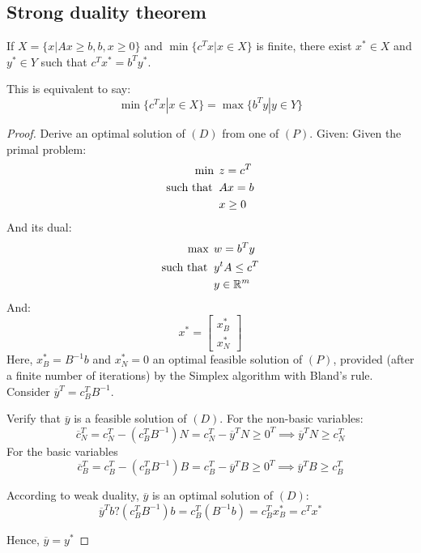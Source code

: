 \subsection{Strong duality theorem}
\begin{theorem}
    If $X=\{x|Ax \geq b, b,x \geq 0\}$ and $\min\{c^Tx|x \in X\}$ is finite, there exist $x^{*} \in X$ and $y^{*} \in Y$ such that $c^Tx^{*}=b^Ty^{*}$. 
\end{theorem}
This is equivalent to say: 
\[\min\{c^Tx|x \in X\}=\max\{b^Ty|y \in Y\}\]
\begin{proof}
    Derive an optimal solution of $(D)$ from one of $(P)$. Given: 
    Given the primal problem: 
    \begin{align*}
        \min                      \:&\: z=c^T            \\
        \textnormal{such that }     &\: Ax = b         \\
                                    &\: x \geq 0
    \end{align*}
    And its dual: 
    \begin{align*}
        \max                      \:&\: w=b^Ty              \\
        \textnormal{such that }     &\: y^tA \leq c^T       \\
                                    &\: y \in \mathbb{R}^m
    \end{align*}
    And: 
    \[x^{*}=\begin{bmatrix}
        x^{*}_B \\ 
        x^{*}_N
    \end{bmatrix}\]
    Here, $x^{*}_B=B^{-1}b$ and $x^{*}_N=0$ an optimal feasible solution of $(P)$, provided (after a finite number of iterations) by the Simplex algorithm with Bland's rule. 
    Consider $\overline{y}^T=c_B^TB^{-1}$.
    
    Verify that $\overline{y}$ is a feasible solution of $(D)$. 
    For the non-basic variables: 
    \[\overline{c}_N^T=c_N^T-(c_B^TB^{-1})N=c_N^T-\overline{y}^TN \geq 0^T \implies \overline{y}^TN \geq c_N^T\]
    For the basic variables 
    \[\overline{c}_B^T=c_B^T-(c_B^TB^{-1})B=c_B^T-\overline{y}^TB \geq 0^T \implies \overline{y}^TB \geq c_B^T\]
    
    According to weak duality, $\overline{y}$ is an optimal solution of $(D)$: 
    \[\overline{y}^Tb?(c_B^TB^{-1})b=c_B^T(B^{-1}b)=c_B^Tx_B^{*}=c^Tx^{*}\]

    Hence, $\overline{y}=y^{*}$
\end{proof}


